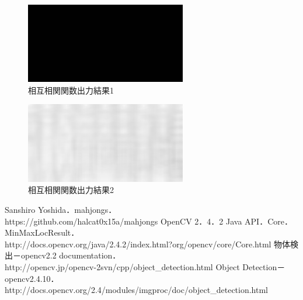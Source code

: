 \documentclass{jsarticle}
\begin{document}
\begin{multicols}{2}
\begin{figure}[H]
  \begin{center}
    \includegraphics[clip,width=7.0cm]{./img/res.png}
    \caption{相互相関関数出力結果1}
    \label{fig:res}
  \end{center}
\end{figure}

\begin{figure}[H]
  \begin{center}
    \includegraphics[clip,width=7.0cm]{./img/res2.png}
    \caption{相互相関関数出力結果2}
    \label{fig:res2}
  \end{center}
\end{figure}

%

\end{multicols}

\newpage

\begin{thebibliography}{9}
	Sanshiro Yoshida．mahjongs．\\
	https://github.com/halcat0x15a/mahjongs
	OpenCV 2．4．2 Java API．Core．MinMaxLocResult．\\
	http://docs.opencv.org/java/2.4.2/index.html?org/opencv/core/Core.html
	物体検出－opencv2.2 documentation． \\
	http://opencv.jp/opencv-2svn/cpp/object\_detection.html
	Object Detection－opencv2.4.10．\\
	http://docs.opencv.org/2.4/modules/imgproc/doc/object\_detection.html
\end{thebibliography}
\end{document}
